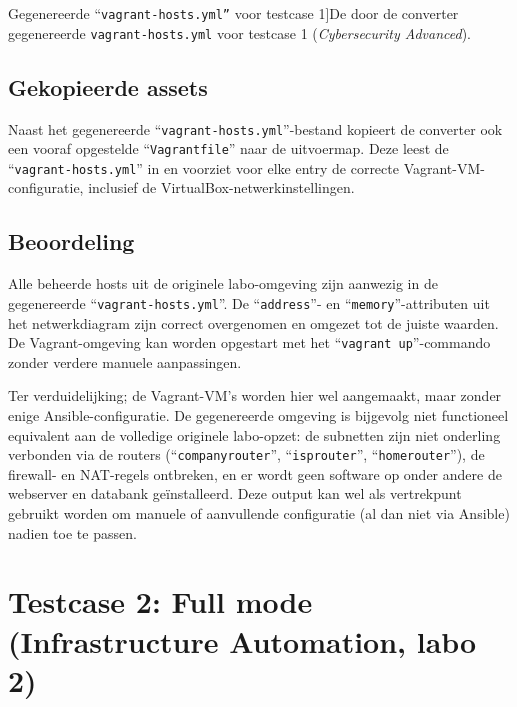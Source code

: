 \begin{codeblock}
    \inputminted{yaml}{../plantuml/output/cybersec_adv_env/vagrant-hosts.yml}
    \caption[Gegenereerde ``\texttt{vagrant-hosts.yml''} voor testcase 1]{De door de converter gegenereerde \texttt{vagrant-hosts.yml} voor testcase 1 (\emph{Cybersecurity Advanced}).}
    \label{code:vagrant_hosts_cybersec}
\end{codeblock}

\subsection{Gekopieerde assets}%
\label{subsec:testcase1_assets}

Naast het gegenereerde ``\texttt{vagrant-hosts.yml}''-bestand kopieert de converter ook een vooraf opgestelde ``\texttt{Vagrantfile}'' naar de uitvoermap. Deze leest de ``\texttt{vagrant-hosts.yml}'' in en voorziet voor elke entry de correcte Vagrant-VM-configuratie, inclusief de VirtualBox-netwerkinstellingen.

\subsection{Beoordeling}%
\label{subsec:testcase1_beoordeling}

Alle beheerde hosts uit de originele labo-omgeving zijn aanwezig in de gegenereerde ``\texttt{vagrant-hosts.yml}''. De ``\texttt{address}''- en ``\texttt{memory}''-attributen uit het netwerkdiagram zijn correct overgenomen en omgezet tot de juiste waarden.
De Vagrant-omgeving kan worden opgestart met het ``\texttt{vagrant up}''-commando zonder verdere manuele aanpassingen.

Ter verduidelijking; de Vagrant-VM's worden hier wel aangemaakt, maar zonder enige Ansible-configuratie. De gegenereerde omgeving is bijgevolg niet functioneel equivalent aan de volledige originele labo-opzet: de subnetten zijn niet onderling verbonden via de routers (``\texttt{companyrouter}'', ``\texttt{isprouter}'', ``\texttt{homerouter}''), de firewall- en NAT-regels ontbreken, en er wordt geen software op onder andere de webserver en databank geïnstalleerd. Deze output kan wel als vertrekpunt gebruikt worden om manuele of aanvullende configuratie (al dan niet via Ansible) nadien toe te passen.

\section{Testcase 2: Full mode (Infrastructure Automation, labo 2)}%
\label{sec:testcase2}

